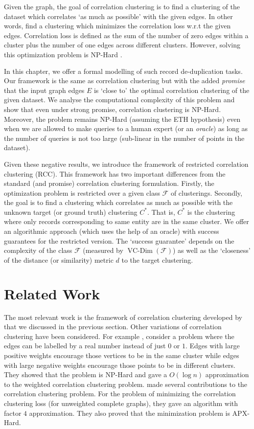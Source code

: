 \documentclass[12pt]{article}
\newcommand{\mc}{\mathcal}
\DeclareMathOperator*{\vcdim}{VC-Dim}
\begin{document}
Given the graph, the goal of correlation clustering is to find a clustering of the dataset which correlates `as much as possible' with the given edges. In other words, find a clustering which minimizes the correlation loss w.r.t the given edges. Correlation loss is defined as the sum of the number of zero edges within a cluster plus the number of one edges across different clusters. However, solving this optimization problem is NP-Hard \cite{bansal2004correlation}. 
  
In this chapter, we offer a formal modelling of such record de-duplication tasks. Our framework is the same as correlation clustering but with the added \textit{promise} that the input graph edges $E$ is `close to' the optimal correlation clustering of the given dataset. We analyse the computational complexity of this problem and show that even under strong promise, correlation clustering is NP-Hard. Moreover, the problem remains NP-Hard (assuming the ETH hypothesis) even when we are allowed to make queries to a human expert (or an \textit{oracle}) as long as the number of queries is not too large (sub-linear in the number of points in the dataset). 

Given these negative results, we introduce the framework of restricted correlation clustering (RCC). This framework has two important differences from the standard (and promise) correlation clustering formulation. Firstly, the optimization problem is restricted over a given class $\mc F$ of clusterings. Secondly, the goal is to find a clustering which correlates as much as possible with the unknown target (or ground truth) clustering $C^*$. That is, $C^*$ is the clustering where only records corresponding to same entity are in the same cluster. We offer an algorithmic approach (which uses the help of an oracle) with success guarantees for the restricted version. The `success guarantee' depends on the complexity of the class $\mc F$ (measured by $\vcdim(\mc F)$) as well as the `closeness' of the distance (or similarity) metric $d$ to the target clustering.

\section{Related Work}
The most relevant work is the framework of correlation clustering developed by \cite{bansal2004correlation} that we discussed in the previous section. Other variations of correlation clustering have been considered. For example \cite{demaine2006correlation}, consider a problem where the edges can be labelled by a real number instead of just $0$ or $1$. Edges with large positive weights encourage those vertices to be in the same cluster while edges with large negative weights encourage those points to be in different clusters. They showed that the problem is NP-Hard and gave a $O(\log n)$ approximation to the weighted correlation clustering problem. \cite{charikar2005clustering} made several contributions to the correlation clustering problem. For the problem of minimizing the correlation clustering loss (for unweighted complete graphs), they gave an algorithm with factor $4$ approximation. They also proved that the minimization problem is APX-Hard. 
\end{document}
